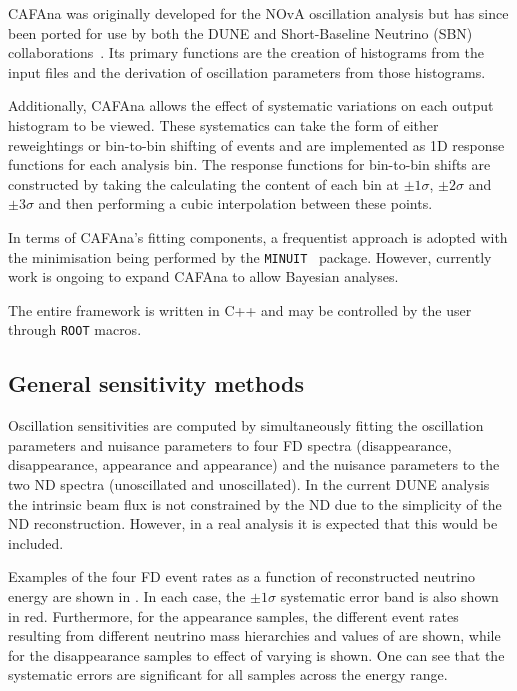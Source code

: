 CAFAna was originally developed for the NOvA oscillation analysis but has since been ported for use by both the DUNE and Short-Baseline Neutrino (SBN) collaborations~\cite{cafana}.
Its primary functions are the creation of histograms from the input files and the derivation of oscillation parameters from those histograms.

Additionally, CAFAna allows the effect of systematic variations on each output histogram to be viewed. 
These systematics can take the form of either reweightings or bin-to-bin shifting of events and are implemented as 1D response functions for each analysis bin.
The response functions for bin-to-bin shifts are constructed by taking the calculating the content of each bin at $\pm 1 \sigma$, $\pm 2 \sigma$ and $\pm 3 \sigma$ and then performing a cubic interpolation between these points.

In terms of CAFAna's fitting components, a frequentist approach is adopted with the minimisation being performed by the \texttt{MINUIT}~\cite{minuit} package.
However, currently work is ongoing to expand CAFAna to allow Bayesian analyses.

The entire framework is written in C++ and may be controlled by the user through \texttt{ROOT} macros.

\subsection{General sensitivity methods}
\label{sec:dune_lbl:sensitivities:general}

Oscillation sensitivities are computed by simultaneously fitting the oscillation parameters and nuisance parameters to four FD spectra (\numu disappearance, \anumu disappearance, \nue appearance and \anue appearance) and the nuisance parameters to the two ND spectra (\numu unoscillated and \anumu unoscillated).
In the current DUNE analysis the intrinsic \nue beam flux is not constrained by the ND due to the simplicity of the ND reconstruction.
However, in a real analysis it is expected that this would be included.

Examples of the four FD event rates as a function of reconstructed neutrino energy are shown in .
In each case, the $\pm1\sigma$ systematic error band is also shown in red.
Furthermore, for the appearance samples, the different event rates resulting from different neutrino mass hierarchies and values of \dcp are shown, while for the disappearance samples to effect of varying  is shown.
One can see that the systematic errors are significant for all samples across the energy range.

